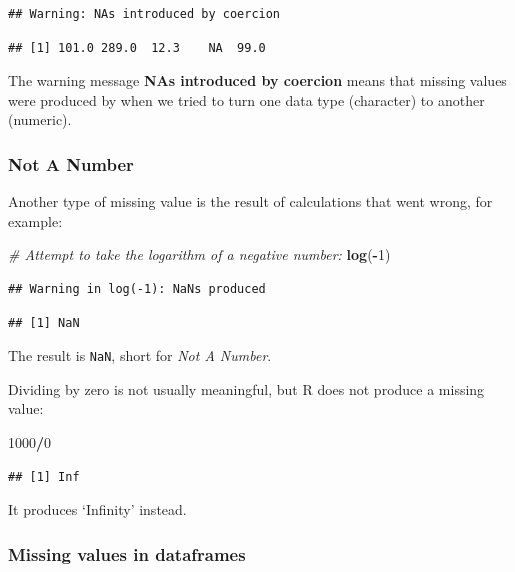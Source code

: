 \documentclass[]{book}
\newenvironment{Shaded}{\begin{snugshade}}{\end{snugshade}}
\newcommand{\CommentTok}[1]{\textcolor[rgb]{0.56,0.35,0.01}{\textit{#1}}}
\newcommand{\DecValTok}[1]{\textcolor[rgb]{0.00,0.00,0.81}{#1}}
\newcommand{\KeywordTok}[1]{\textcolor[rgb]{0.13,0.29,0.53}{\textbf{#1}}}
\newcommand{\NormalTok}[1]{#1}
\newcommand{\OperatorTok}[1]{\textcolor[rgb]{0.81,0.36,0.00}{\textbf{#1}}}
\begin{document}
\begin{verbatim}
## Warning: NAs introduced by coercion
\end{verbatim}

\begin{verbatim}
## [1] 101.0 289.0  12.3    NA  99.0
\end{verbatim}

The warning message \textbf{NAs introduced by coercion} means that missing values were produced by when we tried to turn one data type (character) to another (numeric).

\hypertarget{not-a-number}{%
\subsubsection{Not A Number}\label{not-a-number}}

Another type of missing value is the result of calculations that went wrong, for example:

\begin{Shaded}
\begin{Highlighting}[]
\CommentTok{# Attempt to take the logarithm of a negative number:}
\KeywordTok{log}\NormalTok{(}\OperatorTok{-}\DecValTok{1}\NormalTok{)}
\end{Highlighting}
\end{Shaded}

\begin{verbatim}
## Warning in log(-1): NaNs produced
\end{verbatim}

\begin{verbatim}
## [1] NaN
\end{verbatim}

The result is \texttt{NaN}, short for \emph{Not A Number}.

Dividing by zero is not usually meaningful, but R does not produce a missing value:

\begin{Shaded}
\begin{Highlighting}[]
\DecValTok{1000}\OperatorTok{/}\DecValTok{0}
\end{Highlighting}
\end{Shaded}

\begin{verbatim}
## [1] Inf
\end{verbatim}

It produces `Infinity' instead.

\hypertarget{naindataframe}{%
\subsubsection{Missing values in dataframes}\label{naindataframe}}
\end{document}
